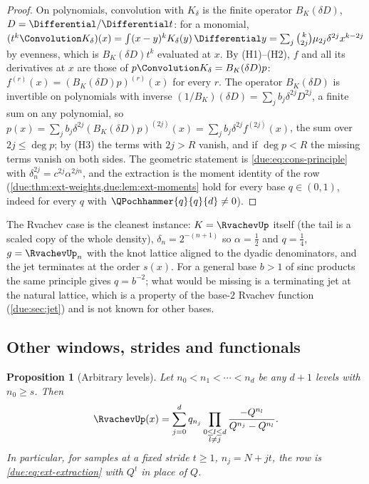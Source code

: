 \documentclass[11pt,oneside]{article}
\theoremstyle{plain}
\newtheorem{proposition}[theorem]{Proposition}
\theoremstyle{definition}
\theoremstyle{remark}
\newcommand{\upn}[1]{\RvachevUp_{#1}}
\newcommand{\dep}[1]{s\!\left(#1\right)}                    %
\newcommand{\Qq}{Q}                                         %
\newcommand{\qn}[1]{q_{#1}}                                 %
\begin{document}
\begin{proof}
On polynomials, convolution with $K_{\delta}$ is the finite operator
$B_{K}(\delta D)$, $D=\Differential/\Differential t$: for a monomial,
$(t^{k}\Convolution K_{\delta})(x)=\int(x-y)^{k}K_{\delta}(y)\,\Differential y
=\sum_{j}\binom{k}{2j}\mu_{2j}\delta^{2j}x^{k-2j}$ by evenness, which is
$B_{K}(\delta D)t^{k}$ evaluated at $x$.  By (H1)--(H2), $f$ and all its
derivatives at $x$ are those of $p\Convolution K_{\delta}=B_{K}(\delta D)p$:
$f^{(r)}(x)=(B_{K}(\delta D)p)^{(r)}(x)$ for every $r$.  The operator
$B_{K}(\delta D)$ is invertible on polynomials with inverse
$(1/B_{K})(\delta D)=\sum_{j}b_{j}\delta^{2j}D^{2j}$, a finite sum on any
polynomial, so $p(x)=\sum_{j}b_{j}\delta^{2j}(B_{K}(\delta D)p)^{(2j)}(x)
=\sum_{j}b_{j}\delta^{2j}f^{(2j)}(x)$, the sum over $2j\le\deg p$; by (H3)
the terms with $2j>R$ vanish, and if $\deg p<R$ the missing terms vanish on
both sides.  The geometric statement is
\cref{due:eq:cons-principle} with $\delta_{n}^{2j}=c^{2j}\alpha^{2jn}$, and
the extraction is the moment identity of the row
(\cref{due:thm:ext-weights,due:lem:ext-moments} hold for every base
$q\in(0,1)$, indeed for every $q$ with $\QPochhammer{q}{q}{d}\ne0$).
\end{proof}

The Rvachev case is the cleanest instance: $K=\RvachevUp$ itself (the
tail is a scaled copy of the whole density), $\delta_{n}=2^{-(n+1)}$ so
$\alpha=\tfrac12$ and $q=\tfrac14$, $g=\upn{n}$ with the knot lattice
aligned to the dyadic denominators, and the jet terminates at the order
$\dep{x}$.  For a general base $b>1$ of sinc products the same principle
gives $q=b^{-2}$; what would be missing is a terminating jet at the natural
lattice, which is a property of the base-$2$ Rvachev function
(\cref{due:sec:jet}) and is not known for other bases.

\subsection{Other windows, strides and functionals}
\label{due:sec:cons-windows}

\begin{proposition}[Arbitrary levels]
\label{due:prop:cons-levels}
Let $n_{0}<n_{1}<\cdots<n_{d}$ be any $d+1$ levels with $n_{0}\ge s$.
Then
\begin{equation}
 \RvachevUp(x)=\sum_{j=0}^{d}\qn{n_{j}}\prod_{\substack{0\le l\le d\\ l\ne j}}
 \frac{-\Qq^{n_{l}}}{\Qq^{n_{j}}-\Qq^{n_{l}}} .
 \label{due:eq:cons-levels}
\end{equation}
In particular, for samples at a fixed stride $t\ge1$, $n_{j}=N+jt$, the row
is \cref{due:eq:ext-extraction} with $\Qq^{t}$ in place of $\Qq$.
\end{proposition}
\end{document}
